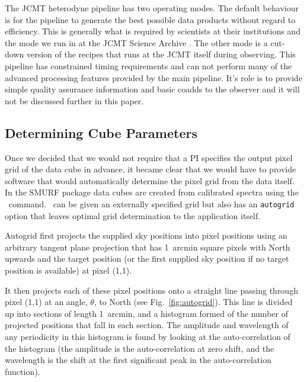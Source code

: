 \documentclass[final,authoryear,5p,times,twocolumn]{elsarticle}
\begin{document}
The JCMT heterodyne pipeline has two operating modes. The default behaviour is
for the pipeline to generate the best possible data products without
regard to efficiency. This is generally what is required by scientists
at their institutions and the mode we run in at the JCMT Science
Archive \citep{2008ASPC..394..565J}. The other mode is a cut-down
version of the recipes that runs at the JCMT itself during
observing. This pipeline has constrained timing requirements and can
not perform many of the advanced processing features provided by the
main pipeline. It's role is to provide simple quality assurance
information and basic coadds to the observer and it will not be
discussed further in this paper.

\subsection{Determining Cube Parameters}

Once we decided that we would not require that a PI specifies the
output pixel grid of the data cube in advance, it became clear that we
would have to provide software that would automatically determine the
pixel grid from the data itself. In the SMURF package data cubes are
created from calibrated spectra using the \makecube\
command. \makecube\ can be given an externally specified grid but also
has an \texttt{autogrid} option that leaves optimal grid determination
to the application itself.

Autogrid first projects the supplied sky positions into pixel
positions using an arbitrary tangent plane projection that has
1~arcmin square pixels with North upwards and the target position
(or the first supplied sky position if no target position is
available) at pixel (1,1).

It then projects each of these pixel positions onto a straight line
passing through pixel (1,1) at an angle, $\theta$, to North (see
Fig.~\ref{fig:autogrid}). This line is divided up into sections of
length 1~arcmin, and a histogram formed of the number of projected
positions that fall in each section. The amplitude and wavelength of
any periodicity in this histogram is found by looking at the
auto-correlation of the histogram (the amplitude is the
auto-correlation at zero shift, and the wavelength is the shift at the
first significant peak in the auto-correlation function).
\end{document}
